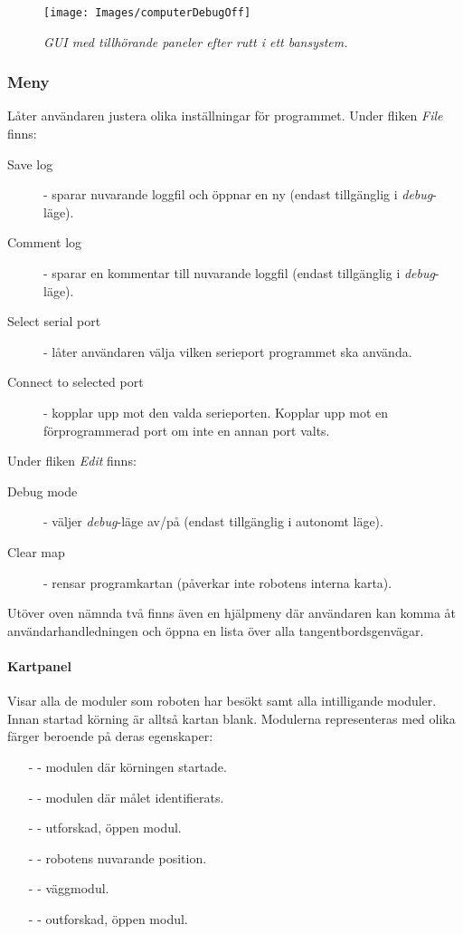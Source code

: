 \documentclass[11pt]{article}
\begin{document}
\begin{figure}[htbp]
	\centering
	\texttt{[image: Images/computerDebugOff]}
	\caption{\textit{GUI med tillhörande paneler efter rutt i ett bansystem.} \label{DebugOff}}
\end{figure}

\subsubsection{Meny} Låter användaren justera olika inställningar för programmet. Under fliken \emph{File}  finns:
\begin{description}
  \item[Save log] - sparar nuvarande loggfil och öppnar en ny (endast tillgänglig i \textit{debug}-läge).
  \item[Comment log] - sparar en kommentar till nuvarande loggfil (endast tillgänglig i \textit{debug}-läge).
	\item[Select serial port] - låter användaren välja vilken serieport programmet ska använda.
	\item[Connect to selected port] - kopplar upp mot den valda serieporten. Kopplar upp mot en förprogrammerad port om inte en annan port valts. 
\end{description}

Under fliken \emph{Edit} finns:
\begin{description}
  \item[Debug mode] - väljer \textit{debug}-läge av/på (endast tillgänglig i autonomt läge).
	\item [Clear map] - rensar programkartan (påverkar inte robotens interna karta).
\end{description}

Utöver oven nämnda två finns även en hjälpmeny där användaren kan komma åt användarhandledningen och öppna en lista över alla tangentbordsgenvägar.

\paragraph{Kartpanel} Visar alla de moduler som roboten har besökt samt alla intilligande moduler. Innan startad körning är alltså kartan blank. Modulerna representeras med olika färger beroende på deras egenskaper:
\begin{itemize}
  \item[-]  - modulen där körningen startade.
  \item[-]  - modulen där målet identifierats.
  \item[-]  - utforskad, öppen modul.
  \item[-]  - robotens nuvarande position.
  \item[-]  - väggmodul.
  \item[-]  - outforskad, öppen modul.
\end{itemize}
\end{document}
